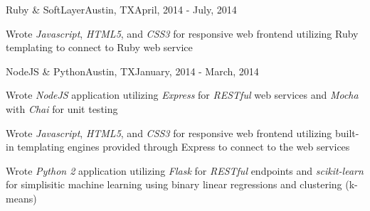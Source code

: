 \documentclass[10pt,a4paper]{article}
\begin{document}
{\begin{resumeinfo}{Ruby \& SoftLayer}{Austin, TX}{April, 2014 - July, 2014}
        \item Wrote \textit{Javascript}, \textit{HTML5}, and \textit{CSS3} for
        responsive web frontend utilizing Ruby templating to connect to Ruby 
        web service
    \end{resumeinfo}
    \addvspace{1em}
    \begin{resumeinfo}{NodeJS \& Python}{Austin, TX}{January, 2014 - March, 2014}
        \item Wrote \textit{NodeJS} application utilizing \textit{Express} for 
        \textit{RESTful} web services and \textit{Mocha} with \textit{Chai}
        for unit testing

        \item Wrote \textit{Javascript}, \textit{HTML5}, and \textit{CSS3} for
        responsive web frontend utilizing built-in templating engines provided
        through Express to connect to the web services

        \item Wrote \textit{Python 2} application utilizing \textit{Flask} for
        \textit{RESTful} endpoints and \textit{scikit-learn} for simplisitic
        machine learning using binary linear regressions and clustering 
        (k-means)
    \end{resumeinfo}
}
    
\end{document}
